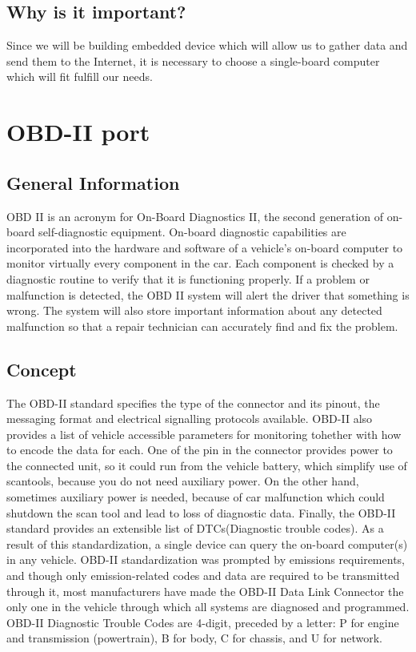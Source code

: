 \subsection{Why is it important?}
Since we will be building embedded device which will allow us to gather data and send them to the Internet, it is necessary to choose a single-board computer which will fit fulfill our needs.

\section{OBD-II port}
\subsection{General Information}
OBD II is an acronym for On-Board Diagnostics II, the second generation of on-board self-diagnostic equipment. On-board diagnostic capabilities are incorporated into the hardware and software of a vehicle's on-board computer to monitor virtually every component in the car. Each component is checked by a diagnostic routine to verify that it is functioning properly. If a problem or malfunction is detected, the OBD II system will alert the driver that something is wrong. The system will also store important information about any detected malfunction so that a repair technician can accurately find and fix the problem.
\subsection{Concept}
The OBD-II standard specifies the type of the connector and its pinout, the messaging format and electrical signalling protocols available. OBD-II also provides a list of vehicle accessible parameters for monitoring tohether with how to encode the data for each. One of the pin in the connector provides power to the connected unit, so it could run from the vehicle battery, which simplify use of scantools, because you do not need auxiliary power. On the other hand, sometimes auxiliary power is needed, because of car malfunction which could shutdown the scan tool and lead to loss of diagnostic data. Finally, the OBD-II standard provides an extensible list of DTCs(Diagnostic trouble codes). As a result of this standardization, a single device can query the on-board computer(s) in any vehicle. OBD-II standardization was prompted by emissions requirements, and though only emission-related codes and data are required to be transmitted through it, most manufacturers have made the OBD-II Data Link Connector the only one in the vehicle through which all systems are diagnosed and programmed. OBD-II Diagnostic Trouble Codes are 4-digit, preceded by a letter: P for engine and transmission (powertrain), B for body, C for chassis, and U for network. \cite{obdiso}
